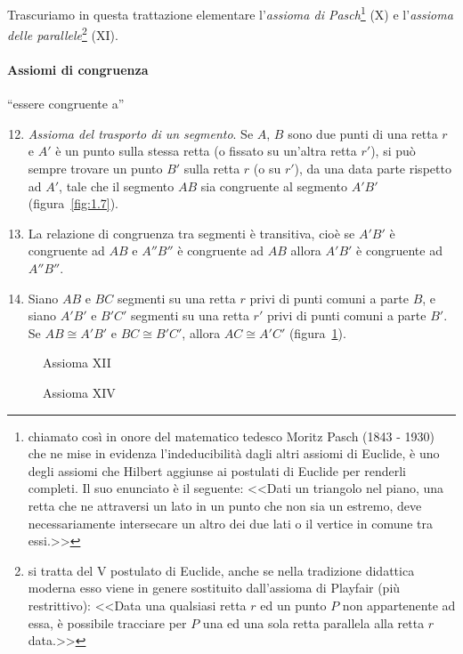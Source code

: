 \osservazione Trascuriamo in questa trattazione elementare 
l'\emph{assioma di Pasch}\footnote{chiamato così in onore del 
matematico tedesco Moritz Pasch (1843 - 1930) che ne mise in evidenza 
l'indeducibilità dagli altri assiomi di Euclide, è uno degli assiomi 
che Hilbert aggiunse ai postulati di Euclide per renderli completi. 
Il suo enunciato è il seguente: <<Dati un triangolo nel piano, una 
retta che ne attraversi un lato in un punto che non sia un estremo, 
deve necessariamente intersecare un altro dei due lati o il vertice 
in comune tra essi.>>} (X) e l'\emph{assioma delle 
parallele}\footnote{si tratta del V postulato di Euclide, anche se 
nella tradizione didattica moderna esso viene in genere sostituito 
dall'assioma di Playfair (più restrittivo): <<Data una qualsiasi 
retta \(r\) ed un punto \(P\) non appartenente ad essa, è possibile 
tracciare per \(P\) una ed una sola retta parallela alla retta \(r\) 
data.>>} (XI).

\paragraph{Assiomi di congruenza} ``essere congruente a''
\begin{enumerate}[label=\Roman{*}.]
\setcounter{enumi}{11}
\item \emph{Assioma del trasporto di un segmento}. Se \(A\), \(B\) sono 
due punti di una retta \(r\) e \(A'\) è un punto sulla stessa retta (o 
fissato su un'altra retta \(r'\)), si può sempre trovare un punto \(B'\) 
sulla retta \(r\) (o su \(r'\)), da una data parte rispetto ad \(A'\), tale 
che il segmento \(AB\) sia congruente al segmento \(A'B'\) 
(figura~\ref{fig:1.7}).
\item La relazione di congruenza tra segmenti è transitiva, cioè se 
\(A'B'\) è congruente ad \(AB\) e \(A''B''\) è congruente ad \(AB\) allora 
\(A'B'\) è congruente ad \(A''B''\).
\item Siano \(AB\) e \(BC\) segmenti su una retta \(r\) privi di punti 
comuni a parte \(B\), e siano \(A'B'\) e \(B'C'\) segmenti su una retta 
\(r'\) privi di punti comuni a parte \(B'\). Se \(AB\cong A'B'\) e \(BC\cong 
B'C'\), allora  \(AC\cong A'C'\) (figura~\ref{fig:1.8}).
\end{enumerate}


\begin{inaccessibleblock}
 \begin{figure}[htb]
 \begin{minipage}[b]{.5\textwidth}
 \centering
 
 \caption{Assioma XII}\label{fig:1.7}
 \end{minipage}
 \begin{minipage}[b]{.5\textwidth}
 \centering
 
 \caption{Assioma XIV}\label{fig:1.8}
 \end{minipage}
\end{figure}
\end{inaccessibleblock}

